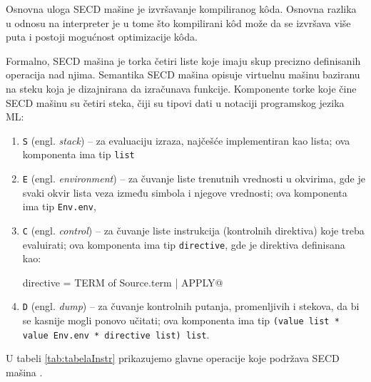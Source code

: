 Osnovna uloga SECD mašine je izvršavanje kompiliranog k\^oda. Osnovna razlika u odnosu na interpreter je u tome što kompilirani k\^od može da se izvršava više puta i postoji mogućnost optimizacije k\^oda. 

Formalno, SECD mašina je torka četiri liste koje imaju skup precizno definisanih operacija nad njima. Semantika SECD mašina opisuje virtuelnu mašinu baziranu na steku koja je dizajnirana da izračunava funkcije. Komponente torke koje čine SECD mašinu su četiri steka, čiji su tipovi dati u notaciji programskog jezika ML:
\begin{enumerate}
	\item \verb|S| (engl. \textit{stack}) -- za evaluaciju izraza, najčešće implementiran kao lista; ova komponenta ima tip \verb|list|  
	\item \verb|E| (engl. \textit{environment}) -- za čuvanje liste trenutnih vrednosti u okvirima, gde je svaki okvir lista veza između simbola i njegove vrednosti; ova komponenta ima tip \verb|Env.env|,
	\item \verb|C| (engl. \textit{control}) -- za čuvanje liste instrukcija (kontrolnih direktiva) koje treba evaluirati; ova komponenta ima tip \verb|directive|, gde je direktiva definisana kao:
	\begin{center}
		\verb@datatype directive = TERM of Source.term | APPLY@
	\end{center}
	\item \verb|D| (engl. \textit{dump}) -- za čuvanje kontrolnih putanja, promenljivih i stekova, da bi se kasnije mogli ponovo učitati; ova komponenta ima tip \verb|(value list * value Env.env * directive list) list|.
\end{enumerate}

U tabeli \ref{tab:tabelaInstr} prikazujemo glavne operacije koje podržava SECD mašina \cite{introduction-fp-systems}.


